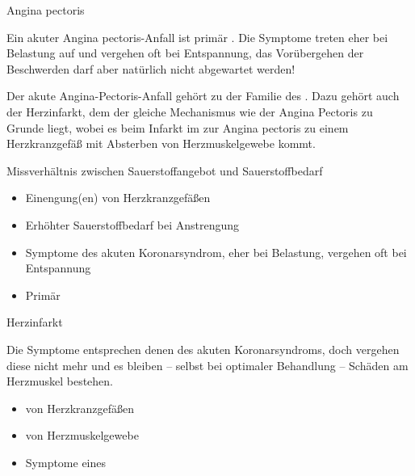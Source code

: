 {Angina pectoris}
{
\label{topic:angina-pectoris}

\noindent{}
Ein akuter Angina pectoris-Anfall ist primär . Die Symptome
treten eher bei Belastung auf und vergehen oft bei
Entspannung, das Vorübergehen der Beschwerden darf aber
natürlich nicht abgewartet werden!



Der akute Angina-Pectoris-Anfall gehört zu der Familie des
. Dazu gehört auch der
Herzinfarkt, dem der gleiche Mechanismus wie der Angina Pectoris zu
Grunde liegt, wobei es beim Infarkt im  zur Angina
pectoris zu einem  Herzkranzgefäß
mit Absterben von Herzmuskelgewebe kommt.
}
{%
Missverhältnis zwischen Sauerstoffangebot und  
Sauerstoffbedarf
\begin{itemize}
  \item Einengung(en) von Herzkranzgefäßen
  \item Erhöhter Sauerstoffbedarf bei Anstrengung
  \item Symptome des akuten Koronarsyndrom,  eher bei
  Belastung, vergehen oft bei Entspannung
  \item Primär 
\end{itemize}
}
{}
{}
{}




{Herzinfarkt}
{
\label{topic:herzinfarkt}
\label{topic:myocardinfarkt}
\label{topic:mci}

\noindent{}
Die Symptome entsprechen denen des akuten Koronarsyndroms, doch vergehen diese nicht mehr und es bleiben --
selbst bei optimaler Behandlung -- Schäden am Herzmuskel
bestehen. 


}
{%
\begin{itemize}
  \item {} von Herzkranzgefäßen
  \item {} von Herzmuskelgewebe
  \item Symptome eines 
\end{itemize}}
{}
{}
{}


